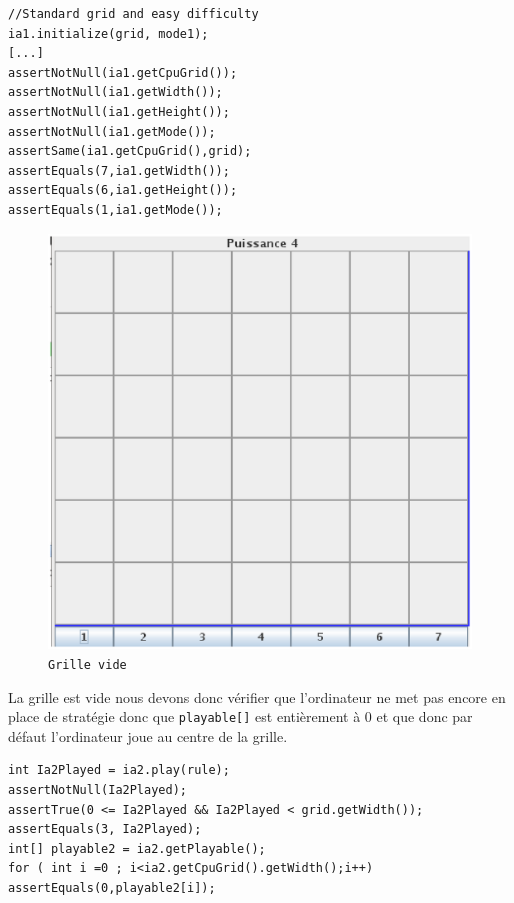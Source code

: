 \begin{verbatim}
//Standard grid and easy difficulty
ia1.initialize(grid, mode1);
[...]
assertNotNull(ia1.getCpuGrid());
assertNotNull(ia1.getWidth());
assertNotNull(ia1.getHeight());
assertNotNull(ia1.getMode());
assertSame(ia1.getCpuGrid(),grid);
assertEquals(7,ia1.getWidth());
assertEquals(6,ia1.getHeight());
assertEquals(1,ia1.getMode());
\end{verbatim}


\begin{figure}[H]
\begin{center}
  \includegraphics[scale=0.2]{nmfigempty}
  \caption{\texttt{Grille vide}}
\end{center}
\end{figure}

La grille est vide nous devons donc vérifier que l'ordinateur ne met pas encore en place de stratégie donc que 
\texttt{playable[]} est entièrement à 0 et que donc par défaut l'ordinateur joue au centre de la grille.


\begin{verbatim}
int Ia2Played = ia2.play(rule);
assertNotNull(Ia2Played);
assertTrue(0 <= Ia2Played && Ia2Played < grid.getWidth());
assertEquals(3, Ia2Played);
int[] playable2 = ia2.getPlayable();
for ( int i =0 ; i<ia2.getCpuGrid().getWidth();i++)
assertEquals(0,playable2[i]);
\end{verbatim}


